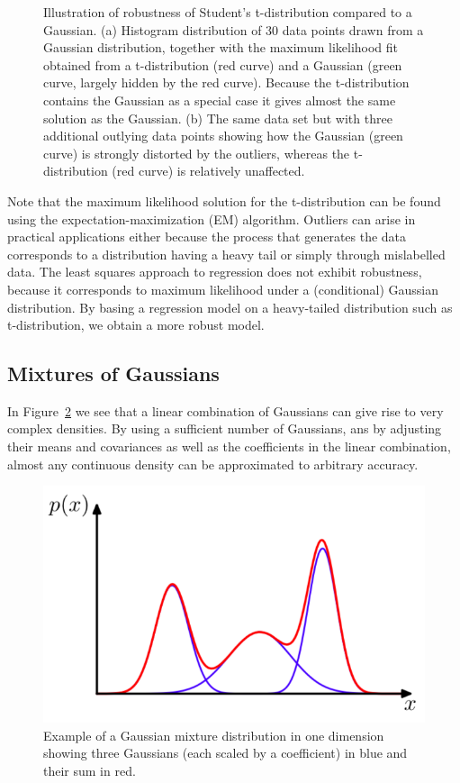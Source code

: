 \documentclass[5p,sort&compress]{elsarticle}
\begin{document}
\begin{figure}
     \caption{Illustration of robustness of Student's t-distribution compared to a Gaussian. (a) Histogram distribution of 30 data points drawn from a Gaussian distribution, together with the maximum likelihood fit obtained from a t-distribution (red curve) and a Gaussian (green curve, largely hidden by the red curve). Because the t-distribution contains the Gaussian as a special case it gives almost the same solution as the Gaussian. (b) The same data set but with three additional outlying data points showing how the Gaussian (green curve) is strongly distorted by the outliers, whereas the t-distribution (red curve) is relatively unaffected.}
     \label{fig:2.16}
\end{figure}

Note that the maximum likelihood solution for the t-distribution can be found using the expectation-maximization (EM) algorithm. Outliers can arise in practical applications either because the process that generates the data corresponds to a distribution having a heavy tail or simply through mislabelled data. The least squares approach to regression does not exhibit robustness, because it corresponds to maximum likelihood under a (conditional) Gaussian distribution. By basing a regression model on a heavy-tailed distribution such as t-distribution, we obtain a more robust model.


\subsection{Mixtures of Gaussians}

In Figure~\ref{fig:2.22} we see that a linear combination of Gaussians can give rise to very complex densities. By using a sufficient number of Gaussians, ans by adjusting their means and covariances as well as the coefficients in the linear combination, almost any continuous density can be approximated to arbitrary accuracy.

\begin{figure}
     \centering
     \includegraphics[width = \linewidth]{figure/fig2-22.png}
     \caption{Example of a Gaussian mixture distribution in one dimension showing three Gaussians (each scaled by a coefficient) in blue and their sum in red.}
     \label{fig:2.22}
\end{figure}
\end{document}
